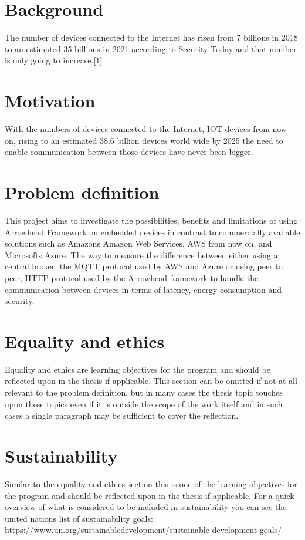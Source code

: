 \section{Background}
The number of devices connected to the Internet has risen from 7 billions in 2018 to an estimated 35 billions in 2021 according to Security Today and that number is only going to increase.[1] %
\section{Motivation}
With the numbers of devices connected to the Internet, IOT-devices from now on, rising to an estimated 38.6 billion devices world wide by 2025 the need to enable communication between those devices have never been bigger.
\section{Problem definition}
This project aims to investigate the possibilities, benefits and 
limitations of using Arrowhead Framework on embedded devices
in contrast to commercially available solutions such 
as Amazons Amazon Web Services, AWS 
from now on, and Microsofts Azure.  
The way to measure the difference between either 
using a central broker, the MQTT protocol used by AWS and Azure or using peer to peer, 
HTTP protocol used by the Arrowhead framework to handle the communication between devices in terms of latency, 
energy consumption and
security.

\section{Equality and ethics}
Equality and ethics are learning objectives for the program and should be reflected upon in the thesis if applicable. This section can be omitted if not at all relevant to the problem definition, but in many cases the thesis topic touches upon these topics even if it is outside the scope of the work itself and in such cases a single paragraph may be sufficient to cover the reflection.
\section{Sustainability}
Similar to the equality and ethics section this is one of the learning objectives for the program and should be reflected upon in the thesis if applicable. For a quick overview of what is considered to be included in sustainability you can see the united nations list of sustainability goals: https://www.un.org/sustainabledevelopment/sustainable-development-goals/
